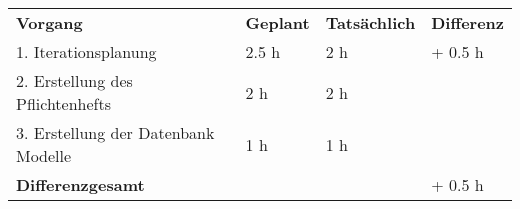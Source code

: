 \begin{tabu}{llll}
\rowfont{\bfseries\leavevmode\color{headingfont}}\textbf{Vorgang} & \textbf{Geplant} & \textbf{Tatsächlich} & \textbf{Differenz} \\
1. Iterationsplanung & 2.5 h & 2 h & + 0.5 h\\ 
2. Erstellung des Pflichtenhefts & 2 h & 2 h & \\
3. Erstellung der Datenbank Modelle & 1 h & 1 h & \\
\hline
\hline
{}\textbf{Differenzgesamt} & & & + 0.5 h \\
\end{tabu}
